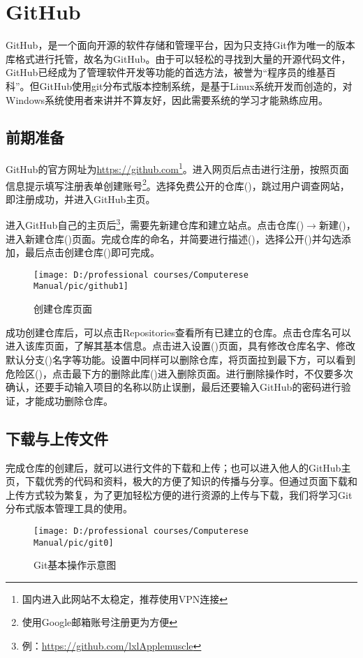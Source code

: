 \documentclass[cn, twoside]{myModel}
\begin{document}
	\maketitle
	\section{GitHub}
		\par{}GitHub，是一个面向开源的软件存储和管理平台，因为只支持Git作为唯一的版本库格式进行托管，故名为GitHub。由于可以轻松的寻找到大量的开源代码文件，GitHub已经成为了管理软件开发等功能的首选方法，被誉为“程序员的维基百科”。但GitHub使用git分布式版本控制系统，是基于Linux系统开发而创造的，对Windows系统使用者来讲并不算友好，因此需要系统的学习才能熟练应用。
		\subsection{前期准备}
			\par{}GitHub的官方网址为\url{https://github.com}\footnote{国内进入此网站不太稳定，推荐使用VPN连接}。进入网页后点击进行注册，按照页面信息提示填写注册表单创建账号\footnote{使用Google邮箱账号注册更为方便}。选择免费公开的仓库()，跳过用户调查网站，即注册成功，并进入GitHub主页。
			\par{}进入GitHub自己的主页后\footnote{例：\url{https://github.com/lxlApplemuscle}}，需要先新建仓库和建立站点。点击仓库()$\rightarrow$新建()，进入新建仓库()页面。完成仓库的命名，并简要进行描述()，选择公开()并勾选添加，最后点击创建仓库()即可完成。
			\begin{figure}[H]
				\centering
				\texttt{[image: D:/professional courses/Computerese Manual/pic/github1]}
				\caption{创建仓库页面}
				\label{pic1}
			\end{figure}
			\par{}成功创建仓库后，可以点击Repositories查看所有已建立的仓库。点击仓库名可以进入该库页面，了解其基本信息。点击进入设置()页面，具有修改仓库名字、修改默认分支()名字等功能。设置中同样可以删除仓库，将页面拉到最下方，可以看到危险区()，点击最下方的删除此库()进入删除页面。进行删除操作时，不仅要多次确认，还要手动输入项目的名称以防止误删，最后还要输入GitHub的密码进行验证，才能成功删除仓库。
		\subsection{下载与上传文件}
			\par{}完成仓库的创建后，就可以进行文件的下载和上传；也可以进入他人的GitHub主页，下载优秀的代码和资料，极大的方便了知识的传播与分享。但通过页面下载和上传方式较为繁复，为了更加轻松方便的进行资源的上传与下载，我们将学习Git分布式版本管理工具的使用。
			\begin{figure}[H]
				\centering
				\texttt{[image: D:/professional courses/Computerese Manual/pic/git0]}
				\caption{Git基本操作示意图}
				\label{pic2}
			\end{figure}
\end{document}
